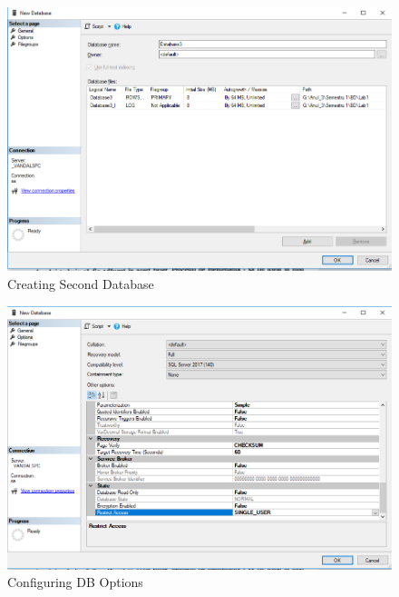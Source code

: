 \documentclass[12pt]{article}
\begin{document}
        
        \begin{figure}[H]
                \centering
                \includegraphics[width=.95\textwidth]{img3.png}
                \caption{Creating Second Database}
        \end{figure}
        \vspace{0.5 cm}

        
        \begin{figure}[H]
                \centering
                \includegraphics[width=.95\textwidth]{img4.png}
                \caption{Configuring DB Options}
        \end{figure}
        \vspace{0.5 cm}
\end{document}

